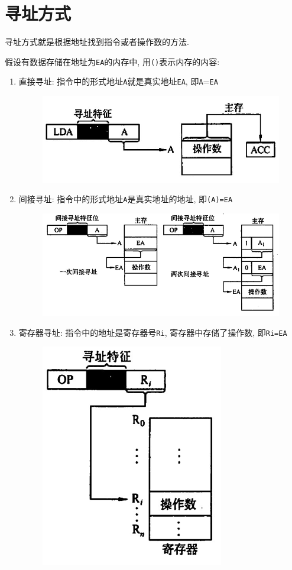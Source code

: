\section{寻址方式}
寻址方式就是根据地址找到指令或者操作数的方法. \par 假设有数据存储在地址为\verb|EA|的内存中, 用\verb|()|表示内存的内容:
\begin{enumerate}
\item 直接寻址: 指令中的形式地址\verb|A|就是真实地址\verb|EA|, 即\verb|A|=\verb|EA|
\begin{figure}[H]
\centering
\includegraphics[scale=.9]{img/figure3.png}
\end{figure}
\item 间接寻址: 指令中的形式地址\verb|A|是真实地址的地址, 即\verb|(A)=EA|
\begin{figure}[H]
\centering
\includegraphics[scale=.9]{img/figure4.png}
\end{figure}
\item 寄存器寻址: 指令中的地址是寄存器号\verb|Ri|, 寄存器中存储了操作数, 即\verb|Ri=EA|
\begin{figure}[H]
\centering
\includegraphics[scale=.9]{img/figure5.png}

\end{figure}
\end{enumerate}
